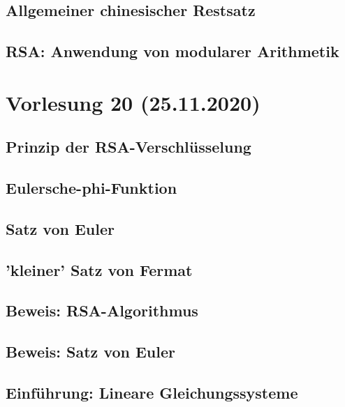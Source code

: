 \documentclass[]{article}
\begin{document}
\subsection*{Allgemeiner chinesischer Restsatz}
\subsection*{RSA: Anwendung von modularer Arithmetik}


\section*{Vorlesung 20 (25.11.2020)}
\subsection*{Prinzip der RSA-Verschlüsselung}
\subsection*{Eulersche-phi-Funktion}
\subsection*{Satz von Euler}
\subsection*{'kleiner' Satz von Fermat}
\subsection*{Beweis: RSA-Algorithmus}
\subsection*{Beweis: Satz von Euler}
\subsection*{Einführung: Lineare Gleichungssysteme}

\end{document}
